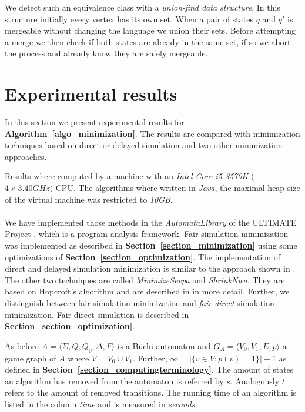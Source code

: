 \documentclass[12pt,oneside,bibliography=totoc,abstracton]{scrartcl}
\newcommand{\sectionref}[1]{\textbf{Section~\ref{#1}}}
\newcommand{\algoref}[1]{\textbf{Algorithm~\ref{#1}}}
\newcommand{\libref}[1]{\textbf{\cite{#1}}}
\begin{document}
We detect such an equivalence class with a \textit{union-find data structure}. In this structure initially every
vertex has its own set. When a pair of states $q$ and $q'$ is mergeable without changing the language
we union their sets. Before attempting a merge we then check if both states are already in the
same set, if so we abort the process and already know they are safely mergeable.

\section{Experimental results}
In this section we present experimental results for \algoref{algo_minimization}.
The results are compared with minimization techniques based on direct or delayed
simulation and two other minimization approaches.

Results where computed by a machine with an \textit{Intel Core i5-3570K} ($4\times3.40GHz)$ CPU.
The algorithms where written in \textit{Java}, the maximal heap size of the virtual machine
was restricted to \textit{10GB}.\\\\
We have implemented those methods in the \textit{AutomataLibrary} of the
ULTIMATE Project \libref{ultimate}, which is a program analysis framework.
Fair simulation minimization was implemented as described in \sectionref{section_minimization}
using some optimizations of \sectionref{section_optimization}. The implementation of direct and
delayed simulation minimization is similar to the approach shown in \libref{simulation_general}.
The other two techniques are called \textit{MinimizeSevpa} and \textit{ShrinkNwa}.
They are based on Hopcroft's algorithm and are described in \libref{minsevpashrinknwa} in more detail.
Further, we distinguish between fair simulation minimization and \textit{fair-direct} simulation
minimization. Fair-direct simulation is described in \sectionref{section_optimization}.

As before $A = \langle \Sigma, Q, Q_0, \Delta, F\rangle$ is a Büchi automaton and
$G_A = \langle V_0, V_1, E, p\rangle$ a game graph of $A$ where $V = V_0 \cup V_1$.
Further, $\infty = |\{v \in V : p(v) = 1\}| + 1$ as defined in \sectionref{section_computingterminology}.
The amount of states an algorithm has removed from the automaton is referred by $s$.
Analogously $t$ refers to the amount of removed transitions. The running time of an algorithm
is listed in the column \textit{time} and is measured in \textit{seconds}.
\end{document}
